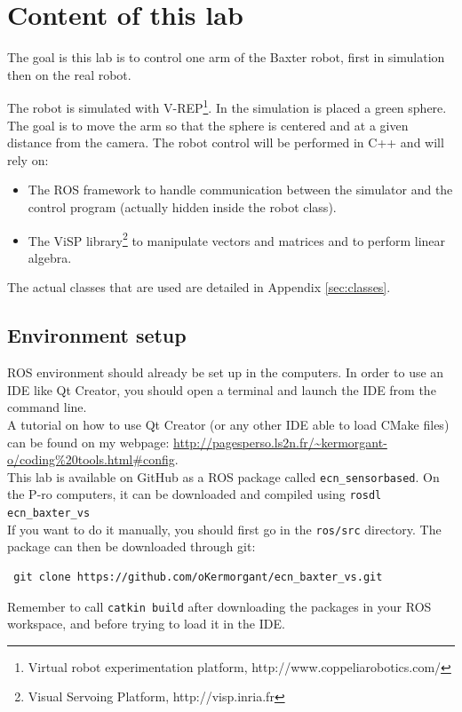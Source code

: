 \documentclass{ecnreport}
\begin{document}


\section{Content of this lab}

The goal is this lab is to control one arm of the Baxter robot, first in simulation then on the real robot. 

The robot is simulated with V-REP\footnote{Virtual robot experimentation platform, http://www.coppeliarobotics.com/}.
In the simulation is placed a green sphere. The goal is to move the arm so that the sphere is centered and at a given distance from the camera.
The robot control will be performed in C++ and will rely on:

\begin{itemize}
 \item The ROS framework to handle communication between the simulator and the control program (actually hidden inside the robot class).
 \item The ViSP library\footnote{Visual Servoing Platform, http://visp.inria.fr} to manipulate vectors and matrices and to perform linear algebra.
\end{itemize}
The actual classes that are used are detailed in Appendix \ref{sec:classes}.\\

\subsection{Environment setup}

ROS environment should already be set up in the computers. 
In order to use an IDE like Qt Creator, you should open a terminal and launch the IDE from the command line.\\ A tutorial on how to use Qt Creator (or any other IDE 
able to load CMake files) can be found on my webpage: \url{http://pagesperso.ls2n.fr/~kermorgant-o/coding\%20tools.html#config}.\\

This lab is available on GitHub as a ROS package called \texttt{ecn\_sensorbased}. 
On the P-ro computers, it can be downloaded and compiled using \texttt{rosdl ecn\_baxter\_vs}\\

If you want to do it manually, you should first go in the \texttt{ros/src} directory. The package can then be downloaded through git:
\begin{center}\cppstyle
\begin{lstlisting}
 git clone https://github.com/oKermorgant/ecn_baxter_vs.git
\end{lstlisting}
\end{center}
Remember to call {\tt{catkin build}} after downloading the packages in your ROS workspace, and before trying to load it in the IDE.
\end{document}
